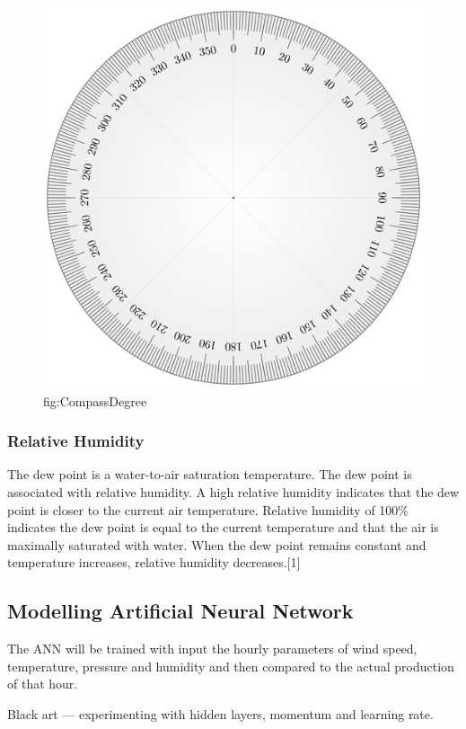 \begin{figure}[h!]
\centering
\includegraphics[width=0.99\linewidth,natwidth=898,natheight=587]{billeder/compassDegree.png}
\caption{fig:CompassDegree}
\label{fig:windDirVsProd}
\end{figure}


\subsubsection{Relative Humidity}
The dew point is a water-to-air saturation temperature. The dew point is associated with relative humidity. A high relative humidity indicates that the dew point is closer to the current air temperature. Relative humidity of 100\% indicates the dew point is equal to the current temperature and that the air is maximally saturated with water. When the dew point remains constant and temperature increases, relative humidity decreases.[1]

\subsection{Modelling Artificial Neural Network}
The ANN will be trained with input the hourly parameters of wind speed, temperature, pressure and humidity and then compared to the actual production of that hour.

Black art --- experimenting with hidden layers, momentum and learning rate. 